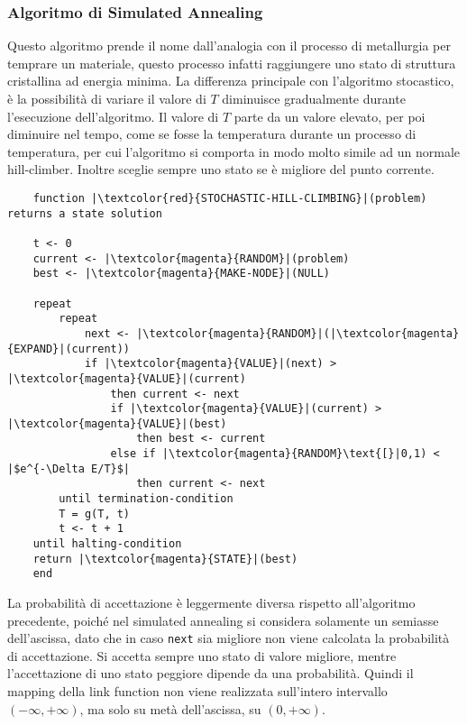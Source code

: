 \documentclass{article}
\numberwithin{equation}{subsection}
\begin{document}
\subsubsection{Algoritmo di Simulated Annealing}

Questo algoritmo prende il nome dall'analogia con il processo di metallurgia per temprare un materiale, questo processo infatti raggiungere uno stato di struttura 
cristallina ad energia minima. La differenza principale con l'algoritmo stocastico, è la possibilità di variare il valore di $T$ diminuisce gradualmente durante l'esecuzione 
dell'algoritmo. Il valore di $T$ parte da un valore elevato, per poi diminuire nel tempo, come se fosse la temperatura durante un processo di temperatura, per cui l'algoritmo si 
comporta in modo molto simile ad un normale hill-climber. Inoltre sceglie sempre uno stato 
se è migliore del punto corrente. 

\begin{verbatim}
    function |\textcolor{red}{STOCHASTIC-HILL-CLIMBING}|(problem) returns a state solution

    t <- 0
    current <- |\textcolor{magenta}{RANDOM}|(problem)
    best <- |\textcolor{magenta}{MAKE-NODE}|(NULL)

    repeat
        repeat
            next <- |\textcolor{magenta}{RANDOM}|(|\textcolor{magenta}{EXPAND}|(current))
            if |\textcolor{magenta}{VALUE}|(next) > |\textcolor{magenta}{VALUE}|(current) 
                then current <- next
                if |\textcolor{magenta}{VALUE}|(current) > |\textcolor{magenta}{VALUE}|(best)   
                    then best <- current
                else if |\textcolor{magenta}{RANDOM}\text{[}|0,1) < |$e^{-\Delta E/T}$| 
                    then current <- next
        until termination-condition
        T = g(T, t)
        t <- t + 1
    until halting-condition
    return |\textcolor{magenta}{STATE}|(best)
    end
\end{verbatim}

La probabilità di accettazione è leggermente diversa rispetto all'algoritmo precedente, poiché nel simulated annealing si considera solamente un semiasse dell'ascissa, dato che in caso \verb|next| sia migliore non viene calcolata la probabilità di accettazione. Si accetta sempre 
uno stato di valore migliore, mentre l'accettazione di uno stato peggiore dipende da una probabilità. 
Quindi il mapping della link function non viene realizzata sull'intero intervallo $(-\infty,+\infty)$, ma solo su metà dell'ascissa, su $(0,+\infty)$. 
\end{document}
